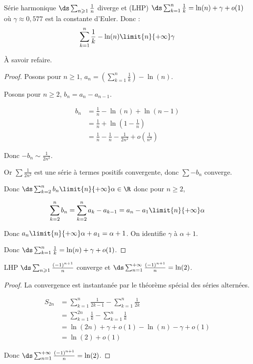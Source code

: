 \begin{proposition}{Série harmonique}{}
    $\ds \sum_{n \geqslant 1} \frac 1 n$ diverge et (LHP)
    $\ds \sum_{k = 1 }^{n } \frac 1 k = \ln(n) + \gamma + o(1)$ où $\gamma \approx 0,577$ est la constante d'Euler.
    Donc :
    \[\sum_{k = 1}^{n} \frac 1 k - \ln(n) \limit{n}{+ \infty} \gamma\]
\end{proposition}

\begin{remarque}
    À savoir refaire.
\end{remarque}


\begin{proof}
    Posons pour $n \geqslant 1$, $\displaystyle a_n = \left( \sum_{k = 1 }^{n } \frac 1 k \right) - \ln(n)$.

    Posons pour $n \geqslant 2$, $b_n = a_n - a_{n - 1}$. 

    \begin{align*}
        b_n & = \frac 1 n - \ln(n) + \ln(n - 1) \\
            & = \frac 1 n + \ln\left( 1 - \frac 1 n \right) \\
            & = \frac 1 n -  \frac 1 n - \frac 1 {2 n^2} + o\left( \frac 1 {n^2} \right) 
    \end{align*}

    Donc $- b_n \sim \frac 1 {2 n^2}$.

    Or $\sum \frac 1 {2 n^2}$ est une série à termes positifs convergente, donc 
    $\sum - b_n$ converge.

    Donc $\ds \sum_{k=2}^n b_n \limit{n}{+ \infty} \alpha\in\R$ donc pour $n \geqslant 2$,

    \[\sum_{k=2}^{n} b_n  = \sum_{k=2}^{n} a_k - a_{k-1} = a_n - a_1\limit{n}{+\infty} \alpha\]

    Donc $a_n \limit{n}{+\infty} \alpha + a_1 = \alpha + 1$. On identifie $\gamma$ à $\alpha + 1$.

    Donc $\ds \sum_{k=1}^{n} \frac 1 k = \ln(n) + \gamma + o(1)$.
\end{proof}

\begin{proposition}{LHP}{}
    $\ds \sum_{n \geqslant 1} \frac {(-1)^{n+1}} n$ converge et $\ds \sum_{n=1}^{+\infty} \frac {(-1)^{n+1}} n = \ln(2)$.
\end{proposition}

\begin{proof}
    La convergence est instantanée par le théorème spécial des séries alternées.

    \begin{align*}
        S_{2n}  &= \sum_{k=1}^n \frac 1 {2k - 1} - \sum_{k=1}^n \frac 1 {2k} \\
                &= \sum_{k=1}^{2n} \frac 1 k - \sum_{k=1}^n \frac 1 k\\
                &= \ln(2n) + \gamma + o(1) - \ln(n) - \gamma + o(1) \\
                &= \ln(2) + o(1)
    \end{align*}

    Donc $\ds \sum_{n=1}^{+\infty} \frac {(-1)^{n+1}} n = \ln(2)$.
\end{proof}

